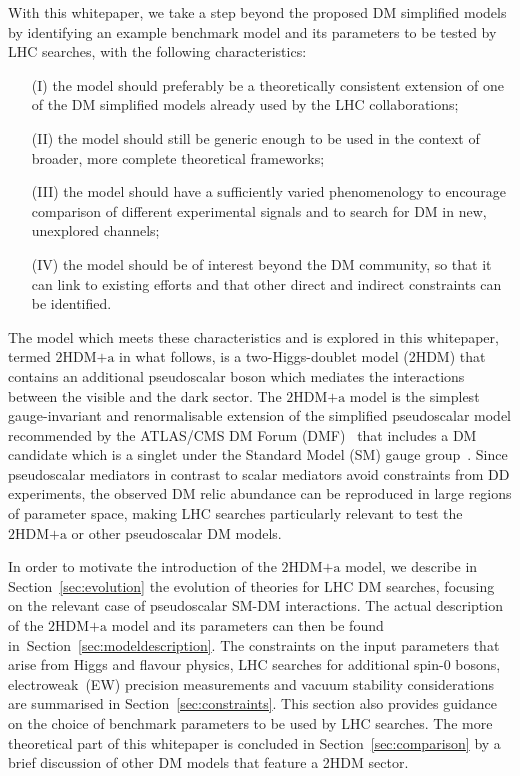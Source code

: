 \documentclass[a4paper, 11pt,notoc]{article}
\newcommand{\hdma}{\ensuremath{\textrm{2HDM+a}}\xspace}
\begin{document}
With this whitepaper, we take a step beyond the proposed DM simplified models by identifying an example benchmark model and its parameters to be tested by LHC searches, with the following characteristics: 
\begin{itemize}
\item[(I)] the model should preferably be a theoretically consistent extension of one of the DM simplified models already used by the LHC collaborations;
\item[(II)] the model should still be generic enough to be used in the context of broader, more complete theoretical frameworks;  
\item[(III)] the model should have a sufficiently varied phenomenology to encourage comparison of different experimental signals and to search for DM in new, unexplored channels;
\item[(IV)] the model should be of interest beyond the DM community, so that it can link to existing efforts and that other direct and indirect constraints can be identified.
\end{itemize}

The model which meets these characteristics and is explored in this whitepaper,  termed \hdma in what follows,  is a two-Higgs-doublet model (2HDM) that contains an additional pseudoscalar boson which  mediates the interactions between the visible and the dark sector.  The \hdma model is the simplest gauge-invariant and renormalisable extension of the  simplified pseudoscalar model recommended by the ATLAS/CMS DM Forum (DMF)~\cite{Abercrombie:2015wmb} that  includes a  DM candidate which is a singlet under the Standard Model (SM) gauge group~\cite{Ipek:2014gua,No:2015xqa,Goncalves:2016iyg,Bauer:2017ota,Tunney:2017yfp}.  Since pseudoscalar mediators in contrast to scalar mediators avoid constraints from DD experiments, the observed DM relic abundance can be reproduced in large regions of parameter space, making LHC searches particularly relevant to test the \hdma or other pseudoscalar DM models.

In order to motivate the introduction of the \hdma model, we describe in Section~\ref{sec:evolution} the evolution of theories for LHC DM searches, focusing on the relevant case of pseudoscalar SM-DM interactions. The actual description of the \hdma model and its parameters can then be found in~Section~\ref{sec:modeldescription}. The constraints on the input parameters that arise from Higgs and flavour physics, LHC searches for additional spin-0 bosons, electroweak~(EW) precision measurements and vacuum stability considerations are summarised in Section~\ref{sec:constraints}. This section also provides guidance on the choice of benchmark parameters to be used by LHC searches. The more theoretical part of this whitepaper is concluded in Section~\ref{sec:comparison} by a brief discussion of other DM models that feature a 2HDM sector. 
\end{document}

